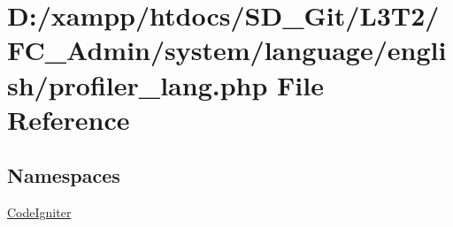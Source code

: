 \hypertarget{profiler__lang_8php}{}\section{D\+:/xampp/htdocs/\+S\+D\+\_\+\+Git/\+L3\+T2/\+F\+C\+\_\+\+Admin/system/language/english/profiler\+\_\+lang.php File Reference}
\label{profiler__lang_8php}
\subsection*{Namespaces}
\begin{DoxyCompactItemize}
\item 
 \hyperlink{namespace_code_igniter}{Code\+Igniter}
\end{DoxyCompactItemize}
